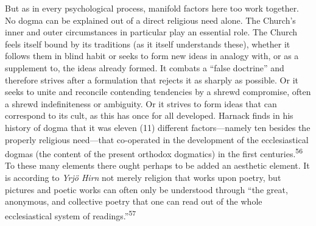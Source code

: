 \documentclass[12pt,a4paper]{book}
\begin{document}
But as in every psychological process, manifold factors here too work together. No dogma can be
explained out of a direct religious need alone. The Church's inner and outer circumstances in
particular play an essential role. The Church feels itself bound by its traditions (as it itself
understands these), whether it follows them in blind habit or seeks to form new ideas in analogy
with, or as a supplement to, the ideas already formed. It combats a ``false doctrine'' and therefore
strives after a formulation that rejects it as sharply as possible. Or it seeks to unite and
reconcile contending tendencies by a shrewd compromise, often a shrewd indefiniteness or ambiguity.
Or it strives to form ideas that can correspond to its cult, as this has once for all developed.
Harnack finds in his history of dogma that it was eleven (11) different factors---namely ten besides
the properly religious need---that co-operated in the development of the ecclesiastical dogmas (the
content of the present orthodox dogmatics) in the first centuries.\textsuperscript{56} To these many
elements there ought perhaps to be added an aesthetic element. It is according to \emph{Yrjö Hirn}
not merely religion that works upon poetry, but pictures and poetic works can often only be
understood through ``the great, anonymous, and collective poetry that one can read out of the whole
ecclesiastical system of readings.''\textsuperscript{57}

\medskip
\end{document}
